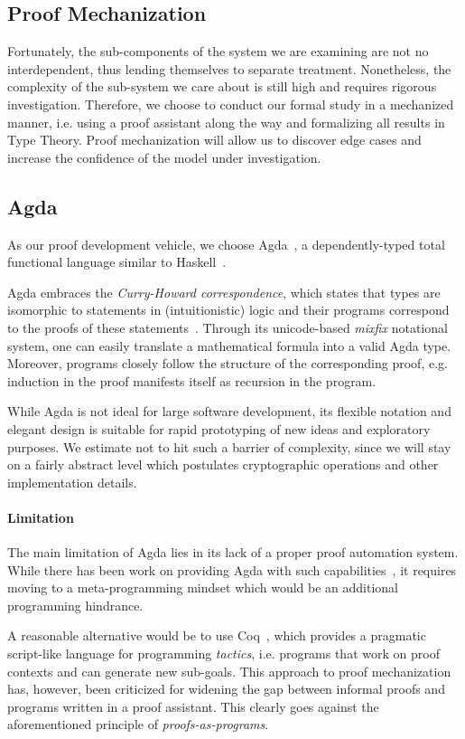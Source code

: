 \documentclass[acmsmall,nonacm=true,screen=true]{acmart}
\begin{document}
\subsection{Proof Mechanization}
Fortunately, the sub-components of the system we are examining are not no interdependent,
thus lending themselves to separate treatment.
Nonetheless, the complexity of the sub-system we care about is still high and requires rigorous investigation.
Therefore, we choose to conduct our formal study in a mechanized manner, i.e. using a proof assistant
along the way and formalizing all results in Type Theory.
Proof mechanization will allow us to discover edge cases and increase the confidence of the model under investigation.

\subsection{Agda}
As our proof development vehicle, we choose Agda~\cite{agda}, a dependently-typed total functional language
similar to Haskell~\cite{haskell}.

Agda embraces the \textit{Curry-Howard correspondence}, which states that types are isomorphic to statements in
(intuitionistic) logic and their programs correspond to the proofs of these statements~\cite{itt}.
Through its unicode-based \textit{mixfix} notational system, one can easily translate a mathematical formula
into a valid Agda type. Moreover, programs closely follow the structure of the corresponding proof, e.g. induction
in the proof manifests itself as recursion in the program.

While Agda is not ideal for large software development, its flexible notation
and elegant design is suitable for rapid prototyping of new ideas and exploratory purposes.
We estimate not to hit such a barrier of complexity,
since we will stay on a fairly abstract level which postulates cryptographic operations and other implementation details.

\paragraph{Limitation}
The main limitation of Agda lies in its lack of a proper proof automation system.
While there has been work on providing Agda with such capabilities~\cite{agdaauto},
it requires moving to a meta-programming mindset which would be an additional programming hindrance.

A reasonable alternative would be to use Coq~\cite{coq}, which provides a pragmatic
script-like language for programming \textit{tactics}, i.e. programs that work on proof contexts and can
generate new sub-goals.
This approach to proof mechanization has, however, been criticized for widening the gap between informal proofs
and programs written in a proof assistant.
This clearly goes against the aforementioned principle of \textit{proofs-as-programs}.
\end{document}
